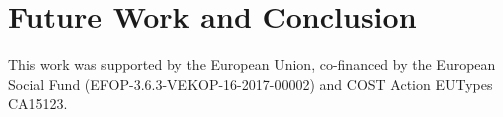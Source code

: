 \documentclass[acmsmall,review,anonymous,prologue,dvipsnames]{acmart}\settopmatter{printfolios=true,printccs=false,printacmref=false}
\theoremstyle{remark}
\begin{document}
\section{Future Work and Conclusion}






\begin{acks}
  This work was supported by the European Union, co-financed by the
  European Social Fund (EFOP-3.6.3-VEKOP-16-2017-00002) and COST Action
  EUTypes CA15123.
\end{acks}


\end{document}
